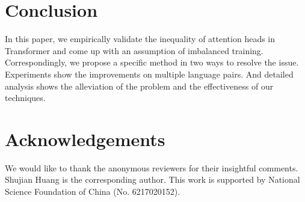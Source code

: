 \documentclass[11pt]{article}
\begin{document}
\section{Conclusion}

In this paper, we empirically validate the inequality of attention heads in Transformer and come up with an assumption of imbalanced training. Correspondingly, we propose a specific method in two ways to resolve the issue. Experiments show the improvements on multiple language pairs. And detailed analysis shows the alleviation of the problem and the effectiveness of our techniques.


\section{Acknowledgements}
We would like to thank the anonymous reviewers for their insightful comments. Shujian Huang is the corresponding author. This work is supported by National Science Foundation of China (No. 6217020152).



\end{document}
